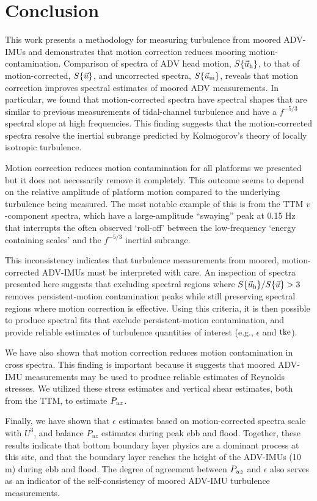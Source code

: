 
\section{Conclusion}
\label{sec:conclusion}
 
This work presents a methodology for measuring turbulence from moored ADV-IMUs and demonstrates that motion correction reduces mooring motion-contamination. Comparison of spectra of ADV head motion, $S\{\vec{u}_\mathrm{h}\}$, to that of motion-corrected, $S\{\vec{u}\}$, and uncorrected spectra, $S\{\vec{u}_\mathrm{m}\}$, reveals that motion correction improves spectral estimates of moored ADV measurements. In particular, we found that motion-corrected spectra have spectral shapes that are similar to previous measurements of tidal-channel turbulence and have a $f^{-5/3}$ spectral slope at high frequencies. This finding suggests that the motion-corrected spectra resolve the inertial subrange predicted by Kolmogorov's theory of locally isotropic turbulence.

Motion correction reduces motion contamination for all platforms we presented but it does not necessarily remove it completely. This outcome seems to depend on the relative amplitude of platform motion compared to the underlying turbulence being measured. The most notable example of this is from the TTM $v$-component spectra, which have a large-amplitude ``swaying'' peak at 0.15 Hz that interrupts the often observed `roll-off' between the low-frequency `energy containing scales' and the $f^{-5/3}$ inertial subrange.

This inconsistency indicates that turbulence measurements from moored, motion-corrected ADV-IMUs must be interpreted with care. An inspection of spectra presented here suggests that excluding spectral regions where $S\{\vec{u}_\mathrm{h}\} / S\{\vec{u}\} > 3$ removes persistent-motion contamination peaks while still preserving spectral regions where motion correction is effective. Using this criteria, it is then possible to produce spectral fits that exclude persistent-motion contamination, and provide reliable estimates of turbulence quantities of interest (e.g., $\epsilon$ and $\mathrm{tke}$).

We have also shown that motion correction reduces motion contamination in cross spectra. This finding is important because it suggests that moored ADV-IMU measurements may be used to produce reliable estimates of Reynolds stresses. We utilized these stress estimates and vertical shear estimates, both from the TTM, to estimate $P_{uz}$. 

Finally, we have shown that $\epsilon$ estimates based on motion-corrected spectra scale with $U^3$, and balance $P_{uz}$ estimates during peak ebb and flood. Together, these results indicate that bottom boundary layer physics are a dominant process at this site, and that the boundary layer reaches the height of the ADV-IMUs (10 m) during ebb and flood. The degree of agreement between $P_{uz}$ and $\epsilon$ also serves as an indicator of the self-consistency of moored ADV-IMU turbulence measurements. 

